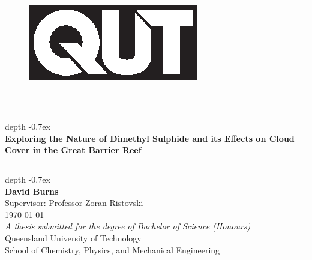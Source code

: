 \documentclass[11pt,a4paper]{report}
\begin{document}
\begin{titlepage}
	\begin{center}
		\begin{figure}[h]
	 	    \centering
	 	    \includegraphics[scale=1.5]{Fig/QUT_Square_Black.eps}
	 	\end{figure}
	 	~\\
		\leavevmode\leaders\hrule height 0.7ex depth -0.7ex\hfill\kern0pt\\
		\LARGE
		\textbf{Exploring the Nature of Dimethyl Sulphide and its Effects on Cloud Cover in the Great Barrier Reef} \\
		\leavevmode\leaders\hrule height 0.7ex depth -0.7ex\hfill\kern0pt\\
		\vfill
		\textbf{David Burns}\\
		Supervisor: Professor Zoran Ristovski\\
		\vfill
		\printdayoff
		\today
		\\
		\vfill
		\large
		\textit{A thesis submitted for the degree of Bachelor of Science (Honours)}\\
		Queensland University of Technology\\
		School of Chemistry, Physics, and Mechanical Engineering

	\end{center}
\end{titlepage}









\tableofcontents
\end{document}
